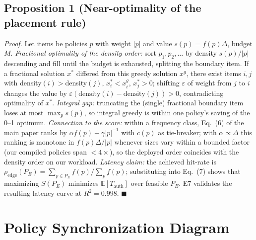 \documentclass[runningheads]{llncs}
\begin{document}
\subsection*{Proposition 1 (Near-optimality of the placement rule)}
\emph{Proof.}
Let items be policies $p$ with weight $|p|$ and value $s(p)=f(p)\Delta$, budget $M$. \emph{Fractional optimality of the density order:} sort $p_1,p_2,\ldots$ by density $s(p)/|p|$ descending and fill until the budget is exhausted, splitting the boundary item. If a fractional solution $x^\ast$ differed from this greedy solution $x^g$, there exist items $i,j$ with density$(i)>$density$(j)$, $x^\ast_i<x^g_i$, $x^\ast_j>0$; shifting $\varepsilon$ of weight from $j$ to $i$ changes the value by $\varepsilon(\mathrm{density}(i)-\mathrm{density}(j))>0$, contradicting optimality of $x^\ast$. \emph{Integral gap:} truncating the (single) fractional boundary item loses at most $\max_p s(p)$, so integral greedy is within one policy's saving of the 0--1 optimum.
\emph{Connection to the score:} within a frequency class, Eq.~(6) of the main paper ranks by $\alpha f(p)+\gamma|p|^{-1}$ with $c(p)$ as tie-breaker; with $\alpha\propto\Delta$ this ranking is monotone in $f(p)\Delta/|p|$ whenever sizes vary within a bounded factor (our compiled policies span $<4\times$), so the deployed order coincides with the density order on our workload.
\emph{Latency claim:} the achieved hit-rate is $\rho_{\mathrm{edge}}(P_E)=\sum_{p\in P_E}f(p)/\sum_p f(p)$; substituting into Eq.~(7) shows that maximizing $S(P_E)$ minimizes $\mathbb{E}[T_{\mathrm{auth}}]$ over feasible $P_E$. E7 validates the resulting latency curve at $R^2=0.998$. \hfill$\blacksquare$

\section{Policy Synchronization Diagram}
\label{s:sync}
\end{document}

